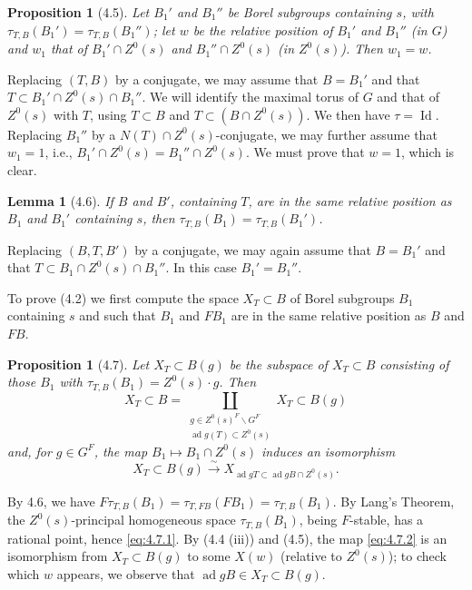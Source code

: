 \documentclass[11pt]{amsart}
\theoremstyle{plain}
\newtheorem{lemma}[theorem]{Lemma}
\newtheorem{proposition}[theorem]{Proposition}
\theoremstyle{remark}
\DeclareMathOperator{\ad}{ad}
\DeclareMathOperator{\id}{Id}
\begin{document}
\begin{proposition}[4.5]
Let $B_1'$ and $B_1''$ be Borel subgroups containing $s$, with $\tau_{T,B}(B_1') = \tau_{T,B}(B_1'')$; let $w$ be the relative position of $B_1'$ and $B_1''$ (in $G$) and $w_1$ that of $B_1' \cap Z^0(s)$ and $B_1'' \cap Z^0(s)$ (in $Z^0(s)$). Then $w_1 = w$.
\end{proposition}

Replacing $(T, B)$ by a conjugate, we may assume that $B = B_1'$ and that $T \subset B_1' \cap Z^0(s) \cap B_1''$. We will identify the maximal torus of $G$ and that of $Z^0(s)$ with $T$, using $T \subset B$ and $T \subset (B \cap Z^0(s))$. We then have $\tau = \id$. Replacing $B_1''$ by a $N(T) \cap Z^0(s)$-conjugate, we may further assume that $w_1 = 1$, i.e., $B_1' \cap Z^0(s) = B_1'' \cap Z^0(s)$. We must prove that $w = 1$, which is clear.

\begin{lemma}[4.6]
If $B$ and $B'$, containing $T$, are in the same relative position as $B_1$ and $B_1'$ containing $s$, then $\tau_{T,B}(B_1) = \tau_{T,B}(B_1')$.
\end{lemma}

Replacing $(B, T, B')$ by a conjugate, we may again assume that $B = B_1'$ and that $T \subset B_1 \cap Z^0(s) \cap B_1''$. In this case $B_1' = B_1''$.

To prove (4.2) we first compute the space $X_T \subset B$ of Borel subgroups $B_1$ containing $s$ and such that $B_1$ and $FB_1$ are in the same relative position as $B$ and $FB$.

\begin{proposition}[4.7]
Let $X_T \subset B(g)$ be the subspace of $X_T \subset B$ consisting of those $B_1$ with $\tau_{T,B}(B_1) = Z^0(s) \cdot g$. Then
\begin{equation}\label{eq:4.7.1}
X_T \subset B = \coprod_{\substack{g \in Z^0(s)^F\backslash G^F \\ \ad g(T) \subset Z^0(s)}} X_T \subset B(g)
\end{equation}
and, for $g \in G^F$, the map $B_1 \mapsto B_1 \cap Z^0(s)$ induces an isomorphism
\begin{equation}\label{eq:4.7.2}
X_T \subset B(g) \xrightarrow{\sim} X_{\ad g T \subset \ad g B \cap Z^0(s)}.
\end{equation}
\end{proposition}

By 4.6, we have $F\tau_{T,B}(B_1) = \tau_{T, FB}(FB_1) = \tau_{T,B}(B_1)$. By Lang's Theorem, the $Z^0(s)$-principal homogeneous space $\tau_{T,B}(B_1)$, being $F$-stable, has a rational point, hence \eqref{eq:4.7.1}. By (4.4 (iii)) and (4.5), the map \eqref{eq:4.7.2} is an isomorphism from $X_T \subset B(g)$ to some $X(w)$ (relative to $Z^0(s)$); to check which $w$ appears, we observe that $\ad g B \in X_T \subset B(g)$.
\end{document}

